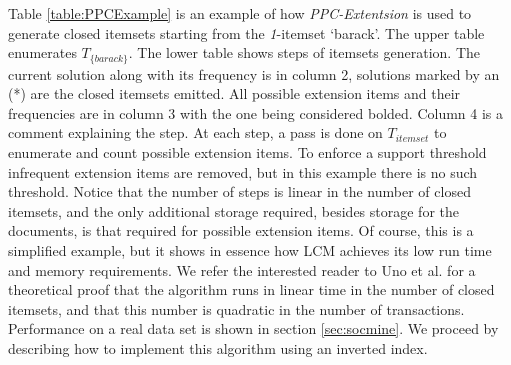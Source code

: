 \documentclass{sig-alternate}
\begin{document}
Table \ref{table:PPCExample} is an example of how \emph{PPC-Extentsion} is
used to generate closed itemsets starting from the
\emph{1}-itemset `barack'.
The upper table enumerates $T_{\{barack\}}$.
The lower table shows steps of itemsets generation.
The current solution along with its frequency is in column 2,
solutions marked by an (*) are the closed itemsets emitted.
All possible extension items and their frequencies are in column 3 with the
one being considered bolded.
Column 4 is a comment explaining the step.
At each step, a pass is done on $T_{itemset}$ to enumerate and count possible
extension items.
To enforce a support threshold infrequent extension items are removed,
but in this example there is no such threshold.
Notice that the number of steps is linear in the number of closed itemsets,
and the only additional storage required, besides storage for the documents,
is that required for possible extension items.
Of course, this is a simplified example, but it shows in essence how LCM
achieves its low run time and memory requirements.
We refer the interested reader to Uno et al.\cite{uno2004lcm} for a
theoretical proof that the algorithm runs in linear time in the number of
closed itemsets,
and that this number is quadratic in the number of transactions.
Performance on a real data set is shown in section \ref{sec:socmine}.
We proceed by describing how to implement this algorithm using an inverted
index.
\end{document}
